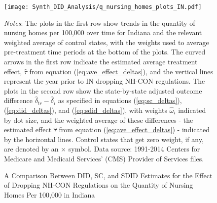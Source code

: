 \documentclass[../Main.tex]{subfiles}
\begin{document}
\newpage
\begin{figure}[t] 
	\begin{center}
	\caption{\label{fig:q_nh_plots_in} \centering A Comparison Between DID, SC, and SDID Estimates for the Effect of Dropping NH-CON Regulations on the Quantity of Nursing Homes Per 100,000 in Indiana}
    \texttt{[image: Synth\_DID\_Analysis/q\_nursing\_homes\_plots\_IN.pdf]}
    \end{center}
    \footnotesize
		\textit{Notes}: The plots in the first row show trends in the quantity of nursing homes per 100,000 over time for Indiana and the relevant weighted average of control states, with the weights used to average pre-treatment time periods at the bottom of the plots. The curved arrows in the first row indicate the estimated average treatment effect, $\hat{\tau}$ from equation (\ref{eq:ave_effect_deltas}), and the vertical lines represent the year prior to IN dropping NH-CON regulations. The plots in the second row show the state-by-state adjusted outcome difference $\hat{\delta}_{tr}-\hat{\delta}_i$ as specified in equations (\ref{eq:sc_deltas}), (\ref{eq:did_deltas}), and (\ref{eq:sdid_deltas}), with weights $\hat{\omega}_i$ indicated by dot size, and the weighted average of these differences - the estimated effect $\hat{\tau}$ from equation (\ref{eq:ave_effect_deltas}) - indicated by the horizontal lines. Control states that get zero weight, if any, are denoted by an $\times$ symbol. Data source: 1991-2014 Centers for Medicare and Medicaid Services’ (CMS) Provider of Services files.
\end{figure}
\clearpage
\end{document}

